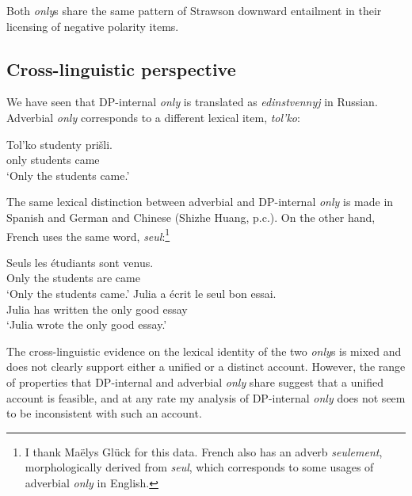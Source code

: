 Both \textit{only}s share the same pattern of Strawson downward entailment in their licensing of negative polarity items.

\subsection{Cross-linguistic perspective}
We have seen that DP-internal \textit{only} is translated as \textit{edinstvennyj} in Russian. Adverbial \textit{only} corresponds to a different lexical item, \textit{tol'ko}:

\begin{exe}
	\ex \gll Tol'ko studenty pri\v{s}li.\\
	only students came\\
	\glt `Only the students came.'
\end{exe}

The same lexical distinction between adverbial and DP-internal \textit{only} is made in Spanish and German \citep{mcnally08} and Chinese (Shizhe Huang, p.c.). On the other hand, French uses the same word, \textit{seul}:\footnote{I thank Ma\"{e}lys Gl\"{u}ck for this data. French also has an adverb \textit{seulement}, morphologically derived from \textit{seul}, which corresponds to some usages of adverbial \textit{only} in English.}

\begin{exe}
	\ex \gll Seuls les \'{e}tudiants sont venus.\\
	Only the students are came\\
	\glt `Only the students came.'
	\ex \gll Julia a \'{e}crit le seul bon essai.\\
	Julia has written the only good essay\\
	\glt `Julia wrote the only good essay.'
\end{exe}

The cross-linguistic evidence on the lexical identity of the two \textit{only}s is mixed and does not clearly support either a unified or a distinct account. However, the range of properties that DP-internal and adverbial \textit{only} share suggest that a unified account is feasible, and at any rate my analysis of DP-internal \textit{only} does not seem to be inconsistent with such an account.